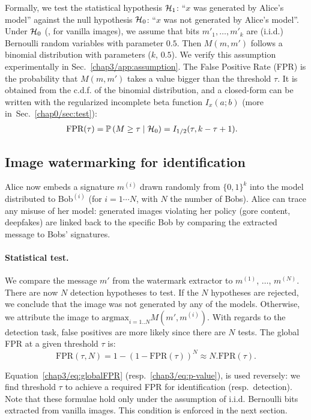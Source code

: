 Formally, we test the statistical hypothesis $\mathcal{H}_1$: ``$x$ was generated by Alice's model'' 
against the null hypothesis $\mathcal{H}_0$: ``$x$ was not generated by Alice's model''.
Under $\mathcal{H}_0$ (\ie, for vanilla images), we assume that bits $m'_1,\ldots, m'_k$ are (i.i.d.) Bernoulli random variables with parameter $0.5$.
Then $M(m, m')$ follows a binomial distribution with parameters ($k$, $0.5$).
We verify this assumption experimentally in Sec.~\ref{chap3/app:assumption}.
The False Positive Rate (FPR) is the probability that $M(m, m')$ takes a value bigger than the threshold $\tau$.
It is obtained from the c.d.f. of the binomial distribution, and a closed-form can be written with the regularized incomplete beta function $I_x(a;b)$ (more in~Sec.~\ref{chap0/sec:test}):
\begin{align}\label{chap3/eq:p-value}
    \text{FPR}(\tau) & = \mathbb{P}\left(M \geq \tau \mid \mathcal{H}_0\right) = I_{1/2}(\tau, k - \tau +1).
\end{align}


\subsection{Image watermarking for identification}
Alice now embeds a signature $m^{(i)}$ drawn randomly from $\{0,1\}^k$ into %
the model distributed to
Bob$^{(i)}$ (for $i=1\cdots N$, with $N$ the number of Bobs).
Alice can trace any misuse of her model: generated images violating her policy (gore content, deepfakes) are linked back to the specific Bob by comparing the extracted message to Bobs' signatures.

\paragraph{Statistical test.}\label{chap3/subsec:statistical-test-identification}
We compare the message $m'$ from the watermark extractor to  $m^{(1)}$, $\dots$, $m^{(N)}$. 
There are now $N$ detection hypotheses to test.
If the $N$ hypotheses are rejected, we conclude that the image was not generated by any of the models.
Otherwise, we attribute the image to $\textrm{argmax}_{i=1..N} M\left(m', m^{(i)}\right)$.
With regards to the detection task, false positives are more likely since there are $N$ tests. 
The global FPR at a given threshold $\tau$ is:
\begin{equation}\label{chap3/eq:globalFPR}
    \text{FPR}(\tau,N) = 1-(1-\text{FPR}(\tau))^N\approx N.\text{FPR}(\tau).
\end{equation}

Equation~\eqref{chap3/eq:globalFPR} (resp.~\eqref{chap3/eq:p-value}), is used reversely: we find threshold $\tau$ to achieve a required FPR for identification (resp.~detection). 
Note that these formulae hold only under the assumption of i.i.d. Bernoulli bits extracted from vanilla images. 
This condition is enforced in the next section. 

